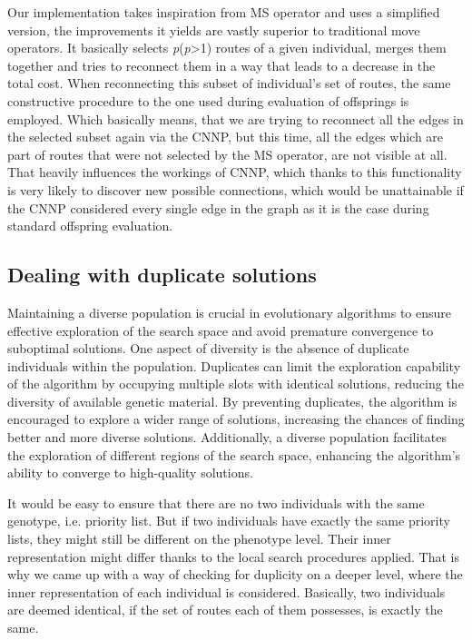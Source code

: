 \documentclass[twoside]{ctuthesis}
\theoremstyle{plain}
\theoremstyle{definition}
\theoremstyle{note}
\begin{document}
Our implementation takes inspiration from MS operator and uses a simplified version, the improvements it yields are vastly superior to traditional move operators.
It basically selects \emph{p}(\emph{p}>1) routes of a given individual, merges them together and tries to reconnect them in a way that leads to a decrease in the total cost. When reconnecting this subset of individual's set of routes, the same constructive procedure to the one used during evaluation of offsprings is employed. Which basically means, that we are trying to reconnect all the edges in the selected subset again via the CNNP, but this time, all the edges which are part of routes that were not selected by the MS operator, are not visible at all. That heavily influences the workings of CNNP, which thanks to this functionality is very likely to discover new possible connections, which would be unattainable if the CNNP considered every single edge in the graph as it is the case during standard offspring evaluation. 


\subsection{Dealing with duplicate solutions}
\label{sec:duplicates}
Maintaining a diverse population is crucial in evolutionary algorithms to ensure effective exploration of the search space and avoid premature convergence to suboptimal solutions. One aspect of diversity is the absence of duplicate individuals within the population. Duplicates can limit the exploration capability of the algorithm by occupying multiple slots with identical solutions, reducing the diversity of available genetic material. By preventing duplicates, the algorithm is encouraged to explore a wider range of solutions, increasing the chances of finding better and more diverse solutions. Additionally, a diverse population facilitates the exploration of different regions of the search space, enhancing the algorithm's ability to converge to high-quality solutions.

It would be easy to ensure that there are no two individuals with the same genotype, i.e. priority list. But if two individuals have exactly the same priority lists, they might still be different on the phenotype level. Their inner representation might differ thanks to the local search procedures applied. That is why we came up with a way of checking for duplicity on a deeper level, where the inner representation of each individual is considered. Basically, two individuals are deemed identical, if the set of routes each of them possesses, is exactly the same.
\end{document}
